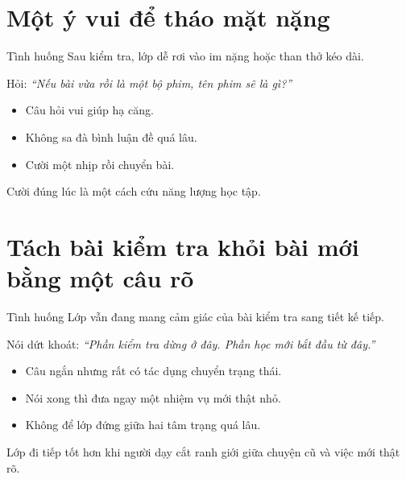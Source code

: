 \section{Một ý vui để tháo mặt nặng}
\begin{tinhhuong}{Tình huống}
Sau kiểm tra, lớp dễ rơi vào im nặng hoặc than thở kéo dài.
\end{tinhhuong}
\begin{goiydungngay}
Hỏi: \textit{``Nếu bài vừa rồi là một bộ phim, tên phim sẽ là gì?''}
\begin{itemize}
\item Câu hỏi vui giúp hạ căng.
\item Không sa đà bình luận đề quá lâu.
\item Cười một nhịp rồi chuyển bài.
\end{itemize}
\end{goiydungngay}
\begin{cauchot}
Cười đúng lúc là một cách cứu năng lượng học tập.
\end{cauchot}
\ngancach

\section{Tách bài kiểm tra khỏi bài mới bằng một câu rõ}
\begin{tinhhuong}{Tình huống}
Lớp vẫn đang mang cảm giác của bài kiểm tra sang tiết kế tiếp.
\end{tinhhuong}
\begin{goiydungngay}
Nói dứt khoát: \textit{``Phần kiểm tra dừng ở đây. Phần học mới bắt đầu từ đây.''}
\begin{itemize}
\item Câu ngắn nhưng rất có tác dụng chuyển trạng thái.
\item Nói xong thì đưa ngay một nhiệm vụ mới thật nhỏ.
\item Không để lớp đứng giữa hai tâm trạng quá lâu.
\end{itemize}
\end{goiydungngay}
\begin{cauchot}
Lớp đi tiếp tốt hơn khi người dạy cắt ranh giới giữa chuyện cũ và việc mới thật rõ.
\end{cauchot}
\ngancach

